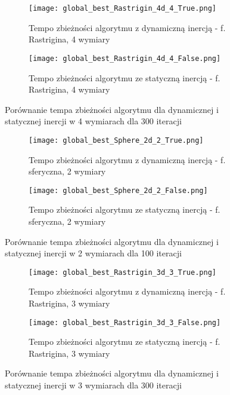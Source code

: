 \documentclass[12pt]{article}
\begin{document}
\begin{figure}[h!]
	\centering
	\begin{subfigure}{0.49\textwidth}
		\texttt{[image: global\_best\_Rastrigin\_4d\_4\_True.png]}
		\caption{Tempo zbieżności algorytmu z dynamiczną inercją - f. Rastrigina, 4 wymiary}
	\end{subfigure}
	\hfill
	\begin{subfigure}{0.49\textwidth}
		\texttt{[image: global\_best\_Rastrigin\_4d\_4\_False.png]}
		\caption{Tempo zbieżności algorytmu ze statyczną inercją - f. Rastrigina, 4 wymiary}
	\end{subfigure}
	\caption{Porównanie tempa zbieżności algorytmu dla dynamicznej i statycznej inercji w 4 wymiarach dla 300 iteracji}
	\label{4d_comp}
\end{figure}

\begin{figure}[h!]
	\centering
	\begin{subfigure}{0.49\textwidth}
		\texttt{[image: global\_best\_Sphere\_2d\_2\_True.png]}
		\caption{Tempo zbieżności algorytmu z dynamiczną inercją - f. sferyczna, 2 wymiary}
	\end{subfigure}
	\hfill
	\begin{subfigure}{0.49\textwidth}
		\texttt{[image: global\_best\_Sphere\_2d\_2\_False.png]}
		\caption{Tempo zbieżności algorytmu ze statyczną inercją - f. sferyczna, 2 wymiary}
	\end{subfigure}
	\caption{Porównanie tempa zbieżności algorytmu dla dynamicznej i statycznej inercji w 2 wymiarach dla 100 iteracji}
	\label{2d_comp}
\end{figure}


\begin{figure}[h!]
	\centering
	\begin{subfigure}{0.49\textwidth}
		\texttt{[image: global\_best\_Rastrigin\_3d\_3\_True.png]}
		\caption{Tempo zbieżności algorytmu z dynamiczną inercją - f. Rastrigina, 3 wymiary}
	\end{subfigure}
	\hfill
	\begin{subfigure}{0.49\textwidth}
		\texttt{[image: global\_best\_Rastrigin\_3d\_3\_False.png]}
		\caption{Tempo zbieżności algorytmu ze statyczną inercją - f. Rastrigina, 3 wymiary}
	\end{subfigure}
	\caption{Porównanie tempa zbieżności algorytmu dla dynamicznej i statycznej inercji w 3 wymiarach dla 300 iteracji}
	\label{3d_comp}
\end{figure}
\end{document}
